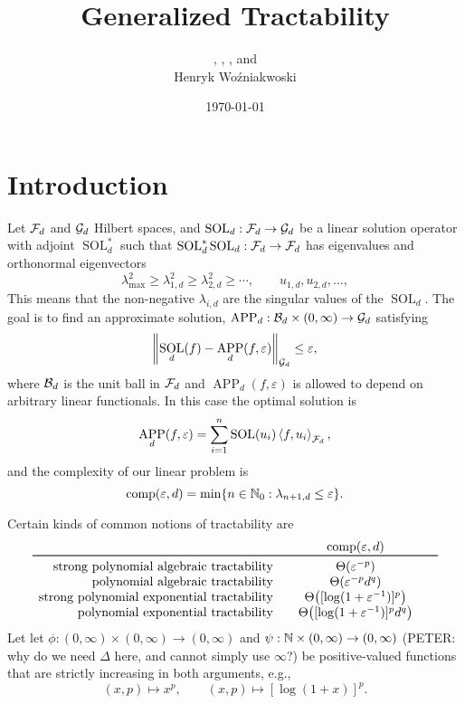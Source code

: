 \documentclass{article}
\title{Generalized Tractability}
\author{\fred{Fred J. Hickernell}, \peter{Peter Kritzer}, \kachi{Onyekachi Osisiogu}, and \\ Henryk Wo\'zniakwoski}
\date{\today}
\DeclareMathOperator{\SOL}{SOL}
\DeclareMathOperator{\APP}{APP}
\theoremstyle{definition}
\newcommand{\peter}[1]{\begingroup\color{purple}#1\endgroup}
\begin{document}
\maketitle

\section{Introduction}

Let $\mathcal{F}_d$ and $\mathcal{G}_d$ Hilbert spaces, and $\SOL_d : \cf_d \to \cg_d$ be a linear solution operator with adjoint $\SOL_d^*$ such that $\SOL_d^*\SOL_d : \cf_d \to \cf_d$ has eigenvalues and orthonormal eigenvectors  
\[
\lambda_{\max}^2 \ge \lambda_{1,d}^2 \ge \lambda_{2,d}^2 \ge \cdots, \qquad u_{1,d}, u_{2,d}, \ldots, 
\]
This means that the non-negative $\lambda_{i,d}$ are the singular values of the $\SOL_d$. The goal is to find an approximate solution, $\APP_d:\cb_d \times (0,\infty) \to \cg_d$ satisfying 
\[
\norm[\cg_d]{\SOL_d(f) - \APP_d(f,\varepsilon)} \le \varepsilon,
\]
where $\mathcal{B}_d$ is the unit ball in $\mathcal{F}_d$ and $\APP_d(f,\varepsilon)$ is allowed to depend on arbitrary linear functionals.  In this case the optimal solution is 
\[
\APP_d(f,\varepsilon) = \sum_{i=1}^n \SOL(u_i) \ip[\cf_d]{f}{u_i},
\]
and the complexity of our linear problem is
\[
\operatorname{comp}(\varepsilon, d) = \min \{n \in \mathbb{N}_{0} : \lambda_{n+1, d} \le \varepsilon\}.
\]

Certain kinds of common notions of tractability are 
\begin{equation*}
    \begin{array}{r@{\qquad}c@{\qquad}c}
    & \comp(\varepsilon, d)\\
    \toprule
    \text{strong polynomial algebraic  tractability} & \Theta(\varepsilon^{-p})\\
    \text{polynomial algebraic tractability} & \Theta(\varepsilon^{-p}d^{q})\\
    \text{strong polynomial exponential tractability} &  \Theta\bigl([\log(1 + \varepsilon^{-1})]^p\bigr)\\
    \text{polynomial exponential tractability} & \Theta\bigl([\log(1 + \varepsilon^{-1})]^p  d^{q}\bigr)
    \end{array}
\end{equation*}
Let let $\phi : (0,\infty) \times (0,\infty) \to (0,\infty)$ and $\psi : \mathbb{N}  \times (0,\infty) \to (0,\infty)$ \peter{(PETER: why do we need $\Delta$ here, and cannot simply use $\infty$?)} be positive-valued functions that are strictly increasing in both arguments, e.g., 
\[
(x,p) \mapsto x^{p}, \qquad (x,p) \mapsto [\log(1+x)]^p.
\]
\end{document}

